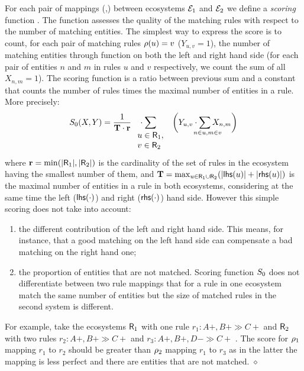 \documentclass[a4paper,twoside]{article}
\begin{document}
For each pair of mappings (\mapcomp,\maprule) between ecosystems $\mathcal{E}_1$ and $\mathcal{E}_2$ we define a \emph{scoring} function \gf.
The function assesses the quality of the matching rules with respect to the number of matching entities. 
The simplest way to express the score is to count,  for each pair of  matching rules  $\rho(u) =v$ (\ie $Y_{u,v}=1$), the number of matching entities through  function \mapcomp on both the left and right hand side (\ie  for each pair of entities $n$ and $m$  in rules $u$ and $v$ respectively, we count the sum of all  $X_{n,m} =1$). 
The scoring function is a ratio between previous sum and a constant that counts the number of rules times  the maximal  number of entities in a  rule.
More precisely: 
$$  \gf_0(X,Y) = {}
   \frac{1}{\Ti\cdot \rulemax} \phantom{m} \cdot \sum_{\mathclap{\begin{array}{l} u \in \Ru_1, \\ v \in \Ru_2 \end{array}}}    \phantom{mm} \bigg( Y_{u,v} \cdot 
  \sum_{\mathrlap{n \in u, m \in v}} X_{n,m}
  \bigg) 
$$
where 
$ \mathbf{r} = \min (|\mathsf{R}_1|, |\mathsf{R}_2|)$ 
is the cardinality of the set of rules in the ecosystem having the smallest number of them, and
$\mathbf{T} = \max_{u\in \mathsf{R}_1 \cup \mathsf{R}_2} (|\mathsf{lhs}(u)| + |\mathsf{rhs}(u)|)$
is the maximal number of entities in a rule in both ecosystems, considering at the same time the left ($\mathsf{lhs}(\cdot)$) and right ($\mathsf{rhs}(\cdot)$) hand side.
However this simple scoring does not take into account:
\begin{enumerate}
\item the different contribution of the left and right hand side. This means, for instance, that a good matching on the left hand side can compensate a bad matching on the right hand one; 
\item the proportion of entities that are not matched. Scoring function $S_0$ does not differentiate between two rule mappings  that for a rule in one ecosystem  match the same number of entities but the size of matched rules in the second system is different.
\end{enumerate}

\begin{example}
For example, take the ecosystems $\mathsf{R}_1$ with one rule ${r_1: A+, B+ \gg C+}$ and  $\mathsf{R}_2$ with two rules ${r_2: A+, B+ \gg C+}$ and ${r_3: A+, B+, D- \gg C+}$ .
The score for $\rho_1$ mapping ${r_1}$ to ${r_2}$ should be greater than $\rho_2$ mapping ${r_1}$ to ${r_3}$ as in the latter the mapping is less perfect and there are entities that are not matched.
\hfill $\diamond$
\end{example}
\end{document}
